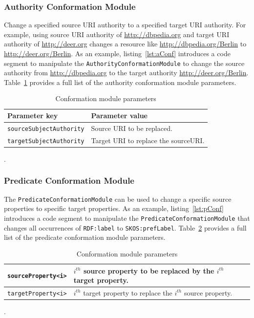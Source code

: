 \documentclass[a4paper,twoside,bibtotoc,abstracton,12pt,BCOR=15mm]{article}
\begin{document}
\subsubsection{Authority Conformation Module}
    Change a specified source URI authority to a specified target URI authority.
    For example, using source URI authority of \url{http://dbpedia.org} and target URI authority of \url{http://deer.org} changes a resource like \url{http://dbpedia.org/Berlin} to \url{http://deer.org/Berlin}.
    As an example, listing~\ref{lst:aConf} introduces a code segment to manipulate the \texttt{AuthorityConformationModule} to change the source authority from \url{http://dbpedia.org} to the target authority \url{http://deer.org/Berlin}.
    Table~\ref{tbl:aConf} provides a full list of the authority conformation module parameters.
    
    \begin{table}
      \caption{Conformation module parameters} \label{tbl:aConf}
      \small
	\begin{tabularx}{\textwidth}{@{}lX@{}}
	    \toprule
	    \textbf{Parameter key} 	& \textbf{Parameter value} \\
	    \toprule
	    \texttt{sourceSubjectAuthority}	& Source URI to be replaced.\\
	    \midrule
	    \texttt{targetSubjectAuthority}	& Target URI to replace the sourceURI.\\
	    \bottomrule
	\end{tabularx}
    \end{table}.
    
\subsubsection{Predicate Conformation Module}
    The \texttt{PredicateConformationModule} can be used to change a specific source properties to specific target properties.
    As an example, listing~\ref{lst:pConf} introduces a code segment to manipulate the \texttt{PredicateConformationModule} that changes all occurrences of \texttt{RDF:label} to \texttt{SKOS:prefLabel}.
    Table~\ref{tbl:pConf} provides a full list of the predicate conformation module parameters.
    

    \begin{table}
    \caption{Conformation module parameters} \label{tbl:pConf}
    \small
    \begin{tabularx}{\textwidth}{@{}lX@{}}
    \toprule
    \texttt{sourceProperty<i>}	& $i^{th}$ source property to be replaced by the $i^{th}$ target property.\\
    \midrule
    \texttt{targetProperty<i>}	& $i^{th}$ target property to replace the $i^{th}$ source property.\\
    \bottomrule
    \end{tabularx}
    \end{table}.
    
\end{document}
